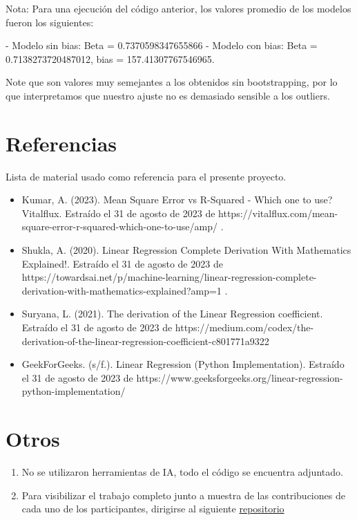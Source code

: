 \documentclass{report}
\begin{document}
    Nota:
    Para una ejecuci\'on del c\'odigo anterior, los valores promedio de los modelos fueron los siguientes:

   - Modelo sin bias: Beta = 0.7370598347655866
   - Modelo con bias: Beta = 0.7138273720487012, bias = 157.41307767546965.

    Note que son valores muy semejantes a los obtenidos sin bootstrapping, por lo que interpretamos que nuestro ajuste no es demasiado sensible a los outliers.

\chapter{Referencias}
    Lista de material usado como referencia para el presente proyecto.
    \begin{itemize}
        \item Kumar, A. (2023). Mean Square Error vs R-Squared - Which one to use? Vitalflux. Estra\'ido el 31 de agosto de 2023 de https://vitalflux.com/mean-square-error-r-squared-which-one-to-use/amp/ .
        \item Shukla, A. (2020). Linear Regression Complete Derivation With Mathematics Explained!. Estra\'ido el 31 de agosto de 2023 de  https://towardsai.net/p/machine-learning/linear-regression-complete-derivation-with-mathematics-explained?amp=1 .
        \item Suryana, L. (2021). The derivation of the Linear Regression coefficient. Estra\'ido el 31 de agosto de 2023 de https://medium.com/codex/the-derivation-of-the-linear-regression-coefficient-c801771a9322
        \item GeekForGeeks. (s/f.). Linear Regression (Python Implementation). Estra\'ido el 31 de agosto de 2023 de https://www.geeksforgeeks.org/linear-regression-python-implementation/
    \end{itemize}

\chapter{Otros}
\begin{enumerate}
    \item No se utilizaron herramientas de IA, todo el c\'odigo se encuentra adjuntado.
    \item Para visibilizar el trabajo completo junto a muestra de las contribuciones de cada uno de los participantes, dirigirse al siguiente \href{https://github.com/ByJuanDiego/linear-regression}{repositorio}
\end{enumerate}
\end{document}
